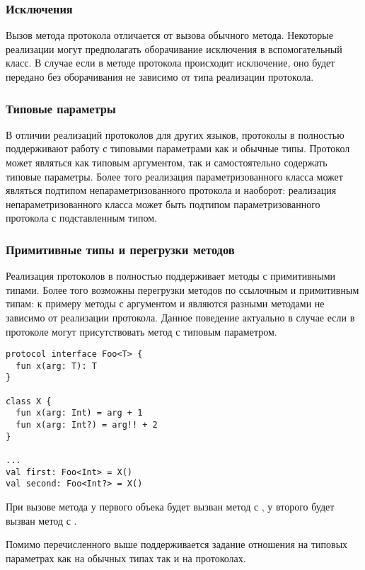 \subsubsection{Исключения}
Вызов метода протокола отличается от вызова обычного метода. Некоторые реализации могут предполагать оборачивание исключения в вспомогательный класс. В случае если в методе протокола происходит исключение, оно будет передано без оборачивания не зависимо от типа реализации протокола.

\subsubsection{Типовые параметры}
В отличии реализаций протоколов для других  языков, протоколы в  полностью поддерживают работу с типовыми параметрами как и обычные типы. Протокол может являться как типовым аргументом, так и самостоятельно содержать типовые параметры. Более того реализация параметризованного класса может являться подтипом непараметризованного протокола и наоборот: реализация непараметризованного класса может быть подтипом параметризованного протокола с подставленным типом.

\subsubsection{Примитивные типы и перегрузки методов}
Реализация протоколов в  полностью поддерживает методы с примитивными типами. Более того возможны перегрузки методов по ссылочным и примитивным типам: к примеру методы с аргументом  и  являются разными методами не зависимо от реализации протокола. Данное поведение актуально в случае если в протоколе могут присутствовать метод с типовым параметром.
\begin{verbatim}
protocol interface Foo<T> {
  fun x(arg: T): T
}

class X {
  fun x(arg: Int) = arg + 1
  fun x(arg: Int?) = arg!! + 2
}

...
val first: Foo<Int> = X()
val second: Foo<Int?> = X()
\end{verbatim}
При вызове метода у первого объека будет вызван метод с , у второго будет вызван метод с .

Помимо перечисленного выше поддерживается задание отношения на типовых параметрах как на обычных типах так и на протоколах.

